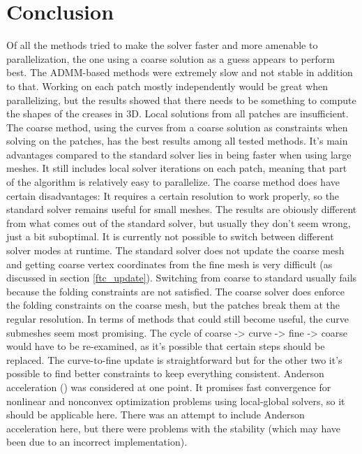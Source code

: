 \documentclass[a4paper,twoside,12pt,nochapterprefix]{scrbook}
\begin{document}
\chapter{Conclusion}\label{sec:conclusion}
Of all the methods tried to make the solver faster and more amenable to parallelization, the one using a coarse solution as a guess appears to perform best.\newline
The ADMM-based methods were extremely slow and not stable in addition to that. Working on each patch mostly independently would be great when parallelizing, but the results showed that there needs to be something to compute the shapes of the creases in 3D. Local solutions from all patches are insufficient.\newline
The coarse method, using the curves from a coarse solution as constraints when solving on the patches, has the best results among all tested methods. It's main advantages compared to the standard solver lies in being faster when using large meshes. It still includes local solver iterations on each patch, meaning that part of the algorithm is relatively easy to parallelize.\newline
The coarse method does have certain disadvantages: It requires a certain resolution to work properly, so the standard solver remains useful for small meshes. The results are obiously different from what comes out of the standard solver, but usually they don't seem wrong, just a bit suboptimal.\newline
It is currently not possible to switch between different solver modes at runtime. The standard solver does not update the coarse mesh and getting coarse vertex coordinates from the fine mesh is very difficult (as discussed in section \ref{ftc_update}). Switching from coarse to standard usually fails because the folding constraints are not satisfied. The coarse solver does enforce the folding constraints on the coarse mesh, but the patches break them at the regular resolution.\newline
In terms of methods that could still become useful, the curve submeshes seem most promising. The cycle of coarse -> curve -> fine -> coarse would have to be re-examined, as it's possible that certain steps should be replaced. The curve-to-fine update is straightforward but for the other two it's possible to find better constraints to keep everything consistent.\newline
Anderson acceleration (\cite{Peng_2018}) was considered at one point. It promises fast convergence for nonlinear and nonconvex optimization problems using local-global solvers, so it should be applicable here. There was an attempt to include Anderson acceleration here, but there were problems with the stability (which may have been due to an incorrect implementation).\newline
\end{document}
